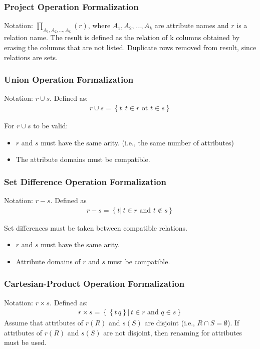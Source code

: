 \subsubsection{Project Operation Formalization}
Notation: $\prod_{A_1,A_2,\dots,A_k} (r)$, where $A_1,A_2,\dots,A_k$ are attribute names and $r$ is a relation name. The result is defined as the relation of k columns obtained by erasing the columns that are not listed. Duplicate rows removed from result, since relations are sets.

\subsubsection{Union Operation Formalization}
Notation: $r \cup s$. Defined as: 
\begin{align*}
    r \cup s = \left\{ t| \, t\in r\text{ ot }t \in s \right\}
\end{align*} 

For $r\cup s$ to be valid: 
\begin{itemize}
    \item $r$ and $s$ must have the same arity. (i.e., the same number of attributes)
    \item The attribute domains must be compatible. 
\end{itemize}

\subsubsection{Set Difference Operation Formalization}
Notation: $r-s$. Defined as 
\begin{align*}
    r-s=\left\{ t| \, t \in r\text{ and }t\notin s \right\}
\end{align*}

Set differences must be taken between compatible relations.
\begin{itemize}
    \item $r$ and $s$ must have the same arity.
    \item Attribute domains of $r$ and $s$ must be compatible.
\end{itemize}

\subsubsection[Cartesian-Product Operation Form-alization]{Cartesian-Product Operation Formalization}
Notation: $r\times s$. Defined as: 
\begin{align*}
    r\times s =\left\{ \left\{ t\, q \right\}|\, t \in r\text{ and }q \in s \right\}
\end{align*}
Assume that attributes of $r(R)$ and $s(S)$ are disjoint (i.e., $R \cap S = \emptyset$). If attributes of $r(R)$ and $s(S)$ are not disjoint, then renaming for attributes must be used.


